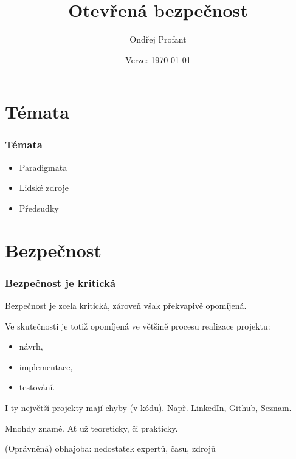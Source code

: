 \documentclass[xetex]{beamer}
\title{Otevřená bezpečnost}
\author{Ondřej Profant}
\institute[Piráti]{Česká pirátská strana\\Cybesecurity 2014}
\date{Verze: \today}
\begin{document}

\begin{frame}
  \titlepage
\end{frame}

\section{Témata}

\begin{frame}
	\frametitle{Témata}
	\begin{itemize}
		\item Paradigmata
		\item Lidské zdroje
		\item Předsudky
	\end{itemize}
\end{frame}	

\section{Bezpečnost}

\begin{frame}
	\frametitle{Bezpečnost je kritická}
	Bezpečnost je zcela kritická, zároveň však překvapivě opomíjená.

	\medskip

	Ve skutečnosti je totiž opomíjená ve většině procesu realizace projektu:

	\begin{itemize}
		\item návrh, 
		\item implementace, 
		\item testování.
	\end{itemize}

	\medskip

\end{frame}

\begin{frame}

\bigskip

I ty největší projekty mají chyby (v kódu). Např. LinkedIn, Github, Seznam.

\bigskip

Mnohdy znamé. Ať už teoreticky, či prakticky.

\bigskip

(Oprávněná) obhajoba: nedostatek expertů, času, zdrojů
\end{frame}
\end{document}

